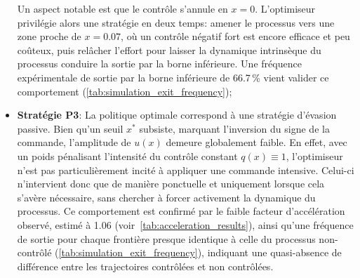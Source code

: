 \begin{itemize}
    Un aspect notable est que le contrôle s'annule en \( x = 0 \). L'optimiseur privilégie alors une stratégie en deux temps: amener le processus vers une zone proche de \( x = 0.07 \), où un contrôle négatif fort est encore efficace et peu coûteux, puis relâcher l'effort pour laisser la dynamique intrinsèque du processus conduire la sortie par la borne inférieure. Une fréquence expérimentale de sortie par la borne inférieure de 66.7\,\% vient valider ce comportement (\ref{tab:simulation_exit_frequency});
    \item \textbf{Stratégie P3}: La politique optimale correspond à une stratégie d'évasion passive. Bien qu'un seuil \(x^*\) subsiste, marquant l'inversion du signe de la commande, l'amplitude de \(u(x)\) demeure globalement faible. En effet, avec un poids pénalisant l'intensité du contrôle constant \(q(x) \equiv 1\), l'optimiseur n'est pas particulièrement incité à appliquer une commande intensive. Celui-ci n'intervient donc que de manière ponctuelle et uniquement lorsque cela s'avère nécessaire, sans chercher à forcer activement la dynamique du processus. Ce comportement est confirmé par le faible facteur d'accélération observé, estimé à 1.06 (voir~\ref{tab:acceleration_results}), ainsi qu'une fréquence de sortie pour chaque frontière presque identique à celle du processus non-contrôlé (\ref{tab:simulation_exit_frequency}), indiquant une quasi-absence de différence entre les trajectoires contrôlées et non contrôlées.
\end{itemize}
